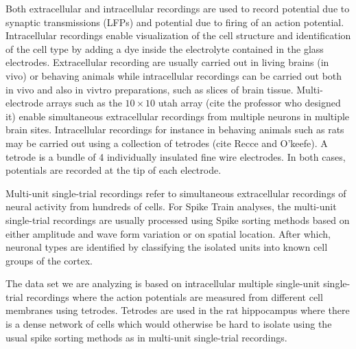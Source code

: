 Both extracellular and intracellular recordings are used to record potential due to synaptic transmissions (LFPs) and potential due to firing of an action potential.
Intracellular recordings enable visualization of the cell structure and identification
of the cell type by adding a dye inside the electrolyte contained in the glass electrodes.
Extracellular recording are usually carried out in living brains (in vivo) or behaving animals
while intracellular recordings can be carried out both in vivo and also in vivtro preparations, such as slices of brain tissue. Multi-electrode arrays such as the $10 \times 10$ utah array (cite the professor who designed it)  enable simultaneous extracellular recordings from  multiple neurons in multiple brain sites. 
Intracellular recordings for instance in behaving animals such as rats may be carried out using 
a collection of tetrodes (cite Recce and O'keefe).
A tetrode is a bundle of 4 individually insulated fine wire electrodes. In both cases, potentials are recorded at the tip of each electrode. 



Multi-unit single-trial recordings refer to simultaneous  extracellular recordings of neural activity from hundreds of cells.
For Spike Train analyses, the multi-unit single-trial recordings are usually processed using  Spike sorting methods  based on  either amplitude and wave form variation or on spatial location. After which, neuronal types are identified by classifying the isolated units into known cell groups of the cortex.

The data set we are analyzing is based on intracellular multiple single-unit single-trial recordings where the action potentials are measured from different cell membranes using tetrodes. Tetrodes are used in the rat hippocampus where there is a dense network of cells which would otherwise be hard to isolate using the usual spike sorting methods as in multi-unit single-trial recordings.


